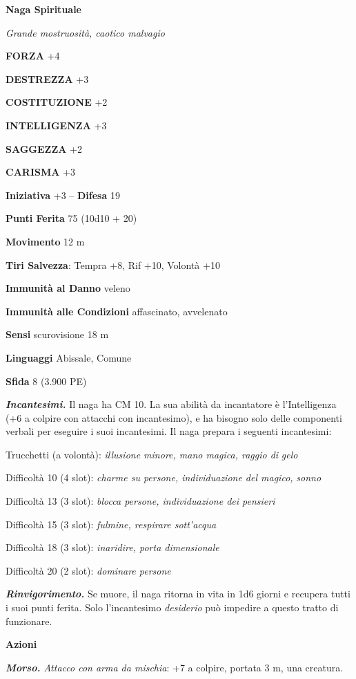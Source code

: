 \begin{multicols}{2}
\medskip{}\textbf{Naga Spirituale}

\emph{Grande mostruosità, caotico malvagio}

\textbf{FORZA} +4

\textbf{DESTREZZA} +3

\textbf{COSTITUZIONE} +2

\textbf{INTELLIGENZA} +3

\textbf{SAGGEZZA} +2

\textbf{CARISMA} +3

\textbf{Iniziativa} +3 -- \textbf{Difesa} 19

\textbf{Punti Ferita} 75 (10d10 + 20)

\textbf{Movimento} 12 m

\textbf{Tiri Salvezza}: Tempra +8, Rif +10, Volontà +10

\textbf{Immunità al Danno} veleno

\textbf{Immunità alle Condizioni} affascinato, avvelenato

\textbf{Sensi} scurovisione 18 m

\textbf{Linguaggi} Abissale, Comune

\textbf{Sfida} 8 (3.900 PE)

\emph{\textbf{Incantesimi.}} Il naga ha CM 10. La sua abilità da incantatore è l'Intelligenza (+6 a colpire con attacchi con incantesimo), e ha bisogno solo delle componenti verbali per eseguire i suoi incantesimi. Il naga prepara i seguenti incantesimi:

Trucchetti (a volontà): \emph{illusione minore, mano magica, raggio di}
\emph{gelo}

Difficoltà 10 (4 slot): \emph{charme su persone, individuazione del
	magico,} \emph{sonno}

Difficoltà 13 (3 slot): \emph{blocca persone, individuazione dei pensieri}

Difficoltà 15 (3 slot): \emph{fulmine, respirare sott'acqua}

Difficoltà 18 (3 slot): \emph{inaridire, porta dimensionale}

Difficoltà 20 (2 slot): \emph{dominare persone}

\emph{\textbf{Rinvigorimento.}} Se muore, il naga ritorna in vita in 1d6 giorni e recupera tutti i suoi punti ferita. Solo l'incantesimo \emph{desiderio} può impedire a questo tratto di funzionare.

\textbf{Azioni}

\emph{\textbf{Morso.} Attacco con arma da mischia}: +7 a colpire,
portata 3 m, una creatura.


\end{multicols}
